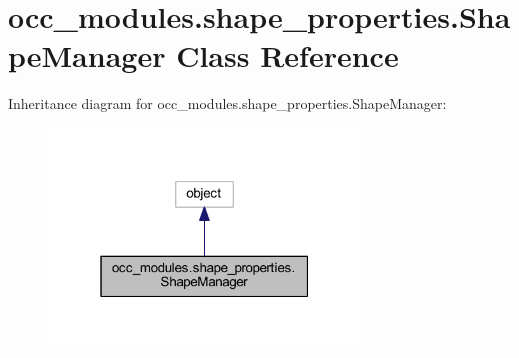 \hypertarget{a00101}{}\section{occ\+\_\+modules.\+shape\+\_\+properties.\+Shape\+Manager Class Reference}
\label{a00101}


Inheritance diagram for occ\+\_\+modules.\+shape\+\_\+properties.\+Shape\+Manager\+:
\nopagebreak
\begin{figure}[H]
\begin{center}
\leavevmode
\includegraphics[width=235pt]{a00100}
\end{center}
\end{figure}
